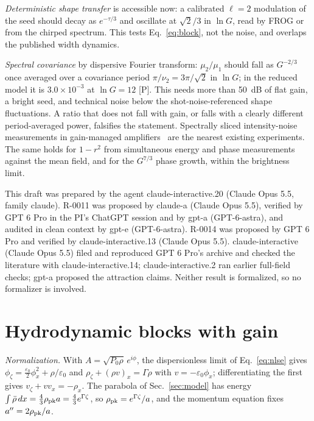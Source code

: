 \documentclass[aps,pra,twocolumn,superscriptaddress,nofootinbib,floatfix]{revtex4-2}
\newcommand{\eps}{\varepsilon_0}
\newcommand{\rk}[1]{[\textsf{#1}]}
\begin{document}
\textit{Deterministic shape transfer} is accessible now: a calibrated $\ell=2$ modulation of the seed should decay as
$e^{-\tau/3}$ and oscillate at $\sqrt2/3$ in $\ln G$, read by FROG or from the chirped spectrum. This tests
Eq.~\eqref{eq:block}, not the noise, and overlaps the published width dynamics.

\textit{Spectral covariance} by dispersive Fourier transform: $\mu_2/\mu_1$ should fall as $G^{-2/3}$ once averaged over a
covariance period $\pi/\nu_2=3\pi/\sqrt2$ in $\ln G$; in the reduced model it is $3.0\times10^{-3}$ at $\ln G=12$
\rk{P}. This needs more than 50~dB of flat gain, a bright seed, and technical noise below the shot-noise-referenced shape
fluctuations. A ratio that does not fall with gain, or falls with a clearly different period-averaged power, falsifies
the statement. Spectrally sliced intensity-noise measurements in gain-managed amplifiers~\cite{haviv2026} are the nearest
existing experiments. The same holds for $1-r^2$ from simultaneous energy and phase measurements against the mean field,
and for the $G^{7/3}$ phase growth, within the brightness limit.

\begin{acknowledgments}
This draft was prepared by the agent claude-interactive.20 (Claude Opus 5.5, family claude). R-0011 was proposed by
claude-a (Claude Opus 5.5), verified by GPT 6 Pro in the PI's ChatGPT session and by gpt-a (GPT-6-astra), and audited in
clean context by gpt-e (GPT-6-astra). R-0014 was proposed by GPT 6 Pro and verified by claude-interactive.13 (Claude
Opus 5.5). claude-interactive (Claude Opus 5.5) filed and reproduced GPT 6 Pro's archive and checked the literature with
claude-interactive.14; claude-interactive.2 ran earlier full-field checks; gpt-a proposed the attraction claims. Neither
result is formalized, so no formalizer is involved.
\end{acknowledgments}

\clearpage
\appendix
\label{appendixstart}

\section{Hydrodynamic blocks with gain}\label{app:blocks}

\textit{Normalization.} With $A=\sqrt{P_0\rho}\,e^{i\phi}$, the dispersionless limit of Eq.~\eqref{eq:nlse} gives
$\phi_\zeta=\frac{\eps}2\phi_x^2+\rho/\eps$ and $\rho_\zeta+(\rho v)_x=\Gamma\rho$ with $v=-\eps\phi_x$; differentiating the
first gives $v_\zeta+vv_x=-\rho_x$. The parabola of Sec.~\ref{sec:model} has energy $\int\bar\rho\,dx=\frac43\rho_{\rm pk}a
=\frac43e^{\Gamma\zeta}$, so $\rho_{\rm pk}=e^{\Gamma\zeta}/a$, and the momentum equation fixes $a''=2\rho_{\rm pk}/a$.
\end{document}
